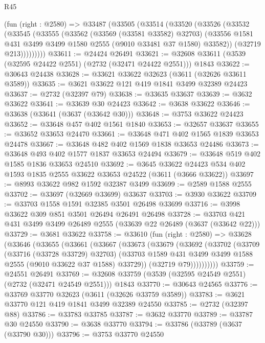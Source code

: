 \begin{lexlean}{R45}
\begin{coremodule}
    (fun (right : @2580) =>
    @33487
      (@33505
        (@33514
          (@33520
            (@33526
              (@33532
                (@33545
                  (@33555
                    (@33562
                      (@33569 (@33581 @33582) @32703)
                      (@33556 @1581 @431 @3499 @3499 @1580 @2555 (@9010 @33481 @37 @1580) @33582))
                    (@32719 @213)))))))))
@33611 := @24424 @26491
@33621 := @32608 @33611 (@3539 (@32595 @24422 @2551) (@2732 (@32471 @24422 @2551))) @1843
@33622 := @30643 @24438
@33628 := @33621 @33622 @32623 (@3611 (@32626 @33611 @3589))
@33635 := @3621 @33622 @121 @419 @1841 @3499 @32389 @24423
@33637 := @2732 (@32397 @79)
@33638 := @33635 @33637
@33639 := @3632 @33622
@33641 := @33639 @30 @24423
@33642 := @3638 @33622
@33646 := @33638 (@33641 (@3637 (@33642 @30)))
@33648 := @3753 @33622 @24423
@33652 := @33648 @457 @402 @1561 @1840
@33653 := @32657 @33637
@33655 := @33652 @33653 @24470
@33661 := @33648 @471 @402 @1565 @1839 @33653 @24478
@33667 := @33648 @482 @402 @1569 @1838 @33653 @24486
@33673 := @33648 @493 @402 @1577 @1837 @33653 @24494
@33679 := @33648 @519 @402 @1585 @1836 @33653 @24510
@33692 := @3645
    @33622
    @24423
    @534
    @402
    @1593
    @1835
    @2555
    @33622
    @33653
    @24522
    (@3611 (@3666 @33622))
@33697 := @8993 @33622 @982 @1592 @32387 @3499
@33699 := @2589 @1588 @2555
@33702 := @33697 (@32669 @33699) @33637
@33703 := @3930 @33622
@33709 := @33703 @1558 @1591 @32385 @3501 @26498 @33699
@33716 := @3998 @33622 @309 @851 @3501 @26494 @26491 @26498
@33728 := @33703 @421 @431 @3499 @3499 @26489 @2555 (@33639 @22 @26489 (@3637 (@33642 @22)))
@33729 := @3681 @33622
@33758 := @33610
    (fun (right : @2580) =>
    @33628
      (@33646
        (@33655
          (@33661
            (@33667
              (@33673
                (@33679
                  (@33692
                    (@33702
                      (@33709
                        (@33716 (@33728 @33729) @32703)
                        (@33703 @1589 @431 @3499 @3499 @1588 @2555 (@9010 @33622 @37 @1588) @33729))
                      (@32719 @79))))))))))
@33759 := @24551 @26491
@33769 := @32608 @33759 (@3539 (@32595 @24549 @2551) (@2732 (@32471 @24549 @2551))) @1843
@33770 := @30643 @24565
@33776 := @33769 @33770 @32623 (@3611 (@32626 @33759 @3589))
@33783 := @3621 @33770 @121 @419 @1841 @3499 @32389 @24550
@33785 := @2732 (@32397 @88)
@33786 := @33783 @33785
@33787 := @3632 @33770
@33789 := @33787 @30 @24550
@33790 := @3638 @33770
@33794 := @33786 (@33789 (@3637 (@33790 @30)))
@33796 := @3753 @33770 @24550

\end{coremodule}
\end{lexlean}

